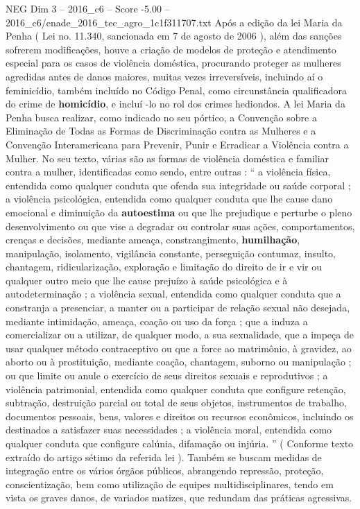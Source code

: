 \begin{textsample}{NEG Dim 3 – 2016\_c6 – Score -5.00 – 2016\_c6/enade\_2016\_tec\_agro\_1c1f311707.txt}
Após a edição da lei Maria da Penha ( Lei no. 11.340, sancionada em 7 de agosto de 2006 ), além das sanções sofrerem modificações, houve a criação de modelos de proteção e atendimento especial para os casos de violência doméstica, procurando proteger as mulheres agredidas antes de danos maiores, muitas vezes irreversíveis, incluindo aí o feminicídio, também incluído no Código Penal, como circunstância qualificadora do crime de \textbf{homicídio}, e incluí -lo no rol dos crimes hediondos.
A lei Maria da Penha busca realizar, como indicado no seu pórtico, a Convenção sobre a Eliminação de Todas as Formas de Discriminação contra as Mulheres e a Convenção Interamericana para Prevenir, Punir e Erradicar a Violência contra a Mulher.
No seu texto, várias são as formas de violência doméstica e familiar contra a mulher, identificadas como sendo, entre outras : “ a violência física, entendida como qualquer conduta que ofenda sua integridade ou saúde corporal ; a violência psicológica, entendida como qualquer conduta que lhe cause dano emocional e diminuição da \textbf{autoestima} ou que lhe prejudique e perturbe o pleno desenvolvimento ou que vise a degradar ou controlar suas ações, comportamentos, crenças e decisões, mediante ameaça, constrangimento, \textbf{humilhação}, manipulação, isolamento, vigilância constante, perseguição contumaz, insulto, chantagem, ridicularização, exploração e limitação do direito de ir e vir ou qualquer outro meio que lhe cause prejuízo à saúde psicológica e à autodeterminação ; a violência sexual, entendida como qualquer conduta que a constranja a presenciar, a manter ou a participar de relação sexual não desejada, mediante intimidação, ameaça, coação ou uso da força ; que a induza a comercializar ou a utilizar, de qualquer modo, a sua sexualidade, que a impeça de usar qualquer método contraceptivo ou que a force ao matrimônio, à gravidez, ao aborto ou à prostituição, mediante coação, chantagem, suborno ou manipulação ; ou que limite ou anule o exercício de seus direitos sexuais e reprodutivos ; a violência patrimonial, entendida como qualquer conduta que configure retenção, subtração, destruição parcial ou total de seus objetos, instrumentos de trabalho, documentos pessoais, bens, valores e direitos ou recursos econômicos, incluindo os destinados a satisfazer suas necessidades ; a violência moral, entendida como qualquer conduta que configure calúnia, difamação ou injúria. ” ( Conforme texto extraído do artigo sétimo da referida lei ).
Também se buscam medidas de integração entre os vários órgãos públicos, abrangendo repressão, proteção, conscientização, bem como utilização de equipes multidisciplinares, tendo em vista os graves danos, de variados matizes, que redundam das práticas agressivas.

\end{textsample}
